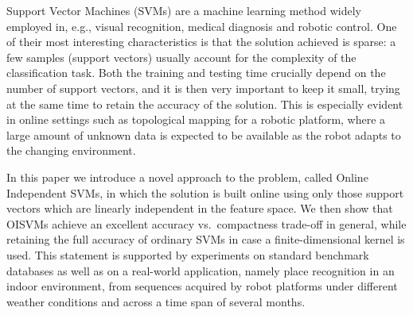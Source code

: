 Support Vector Machines (SVMs) are a machine learning method widely
employed in, e.g., visual recognition, medical diagnosis and robotic
control. One of their most interesting characteristics is that the
solution achieved is sparse: a few samples (support vectors) usually
account for the complexity of the classification task. Both the
training and testing time crucially depend on the number of support
vectors, and it is then very important to keep it small, trying at the
same time to retain the accuracy of the solution. This is especially
evident in online settings such as topological mapping for a robotic
platform, where a large amount of unknown data is expected to be
available as the robot adapts to the changing environment.

In this paper we introduce a novel approach to the problem, called
Online Independent SVMs, in which the solution is built online using
only those support vectors which are linearly independent in the
feature space. We then show that OISVMs achieve an excellent accuracy
vs.~compactness trade-off in general, while retaining the full
accuracy of ordinary SVMs in case a finite-dimensional kernel is
used. This statement is supported by experiments on standard benchmark
databases as well as on a real-world application, namely place
recognition in an indoor environment, from sequences acquired by robot
platforms under different weather conditions and across a time span of
several months.
